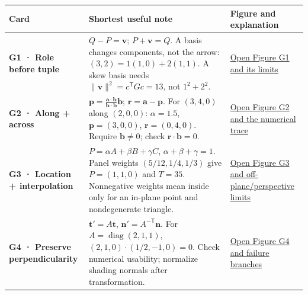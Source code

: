 {\def\LTcaptype{none} %
\begin{longtable}[]{@{}
  >{\raggedright\arraybackslash}p{}
  >{\raggedright\arraybackslash}p{}
  >{\raggedright\arraybackslash}p{}@{}}
\toprule\noalign{}
\begin{minipage}[b]{\linewidth}\raggedright
Card
\end{minipage} & \begin{minipage}[b]{\linewidth}\raggedright
Shortest useful note
\end{minipage} & \begin{minipage}[b]{\linewidth}\raggedright
Figure and explanation
\end{minipage} \\
\midrule\noalign{}
\endhead
\bottomrule\noalign{}
\endlastfoot
\textbf{G1 · Role before tuple} & \(Q-P=\mathbf v\); \(P+\mathbf v=Q\). A basis changes components, not the arrow: \((3,2)=1(1,0)+2(1,1)\). A skew basis needs \(\|\mathbf v\|^2=c^\mathsf TGc=13\), not \(1^2+2^2\). & \href{Continuous\%20Notes/Computing\%20Foundations\%20-\%20From\%20Bits\%20to\%20C++\%20and\%20Systems\%20APIs\#G1\%20-\%20One\%20movement,\%20two\%20descriptions/}{Open Figure G1 and its limits} \\
\textbf{G2 · Along + across} & \(\mathbf p=\frac{\mathbf a\cdot\mathbf b}{\mathbf b\cdot\mathbf b}\mathbf b\); \(\mathbf r=\mathbf a-\mathbf p\). For \((3,4,0)\) along \((2,0,0)\): \(\alpha=1.5\), \(\mathbf p=(3,0,0)\), \(\mathbf r=(0,4,0)\). Require \(\mathbf b\ne0\); check \(\mathbf r\cdot\mathbf b=0\). & \href{Continuous\%20Notes/Computing\%20Foundations\%20-\%20From\%20Bits\%20to\%20C++\%20and\%20Systems\%20APIs\#G2\%20-\%20Split\%20the\%20request\%20into\%20rail\%20travel\%20and\%20sideways\%20travel/}{Open Figure G2 and the numerical trace} \\
\textbf{G3 · Location + interpolation} & \(P=\alpha A+\beta B+\gamma C\), \(\alpha+\beta+\gamma=1\). Panel weights \((5/12,1/4,1/3)\) give \(P=(1,1,0)\) and \(T=35\). Nonnegative weights mean inside only for an in-plane point and nondegenerate triangle. & \href{Continuous\%20Notes/Computing\%20Foundations\%20-\%20From\%20Bits\%20to\%20C++\%20and\%20Systems\%20APIs\#G3\%20-\%20Reconstruct\%20a\%20sensor\%20location\%20from\%20the\%20corners/}{Open Figure G3 and off-plane/perspective limits} \\
\textbf{G4 · Preserve perpendicularity} & \(\mathbf t'=A\mathbf t\), \(\mathbf n'=A^{-\mathsf T}\mathbf n\). For \(A=\operatorname{diag}(2,1,1)\), \((2,1,0)\cdot(1/2,-1,0)=0\). Check numerical usability; normalize shading normals after transformation. & \href{Continuous\%20Notes/Computing\%20Foundations\%20-\%20From\%20Bits\%20to\%20C++\%20and\%20Systems\%20APIs\#G4\%20-\%20Transform\%20the\%20normal\%20and\%20prove\%20the\%20relationship\%20survived/}{Open Figure G4 and failure branches} \\
\end{longtable}
}

